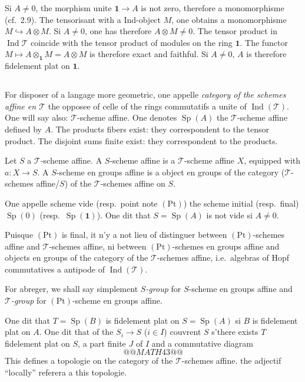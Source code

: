 \documentclass[12pt,a4paper]{article}
\theoremstyle{plain}
\theoremstyle{definition}
\DeclareMathOperator{\Sp}{Sp}
\DeclareMathOperator{\Ind}{Ind}
\begin{document}
Si $A \neq 0$, the morphism unite $\mathbf{1} \to A$ is not zero, therefore a monomorphisme (cf.~2.9). The tensorisant with a Ind-object $M$, one obtains a monomorphisme $M \hookrightarrow A \otimes M$. Si $A \neq 0$, one has therefore $A \otimes M \neq 0$. The tensor product in $\Ind\mathcal{T}$ coincide with the tensor product of modules on the ring $\mathbf{1}$. The functor $M \mapsto A \otimes_\mathbf{1} M = A \otimes M$ is therefore exact and faithful. Si $A \neq 0$, $A$ is therefore fidelement plat on $\mathbf{1}$.

\subsection{}

For disposer of a langage more geometric, one appelle \emph{category of the schemes affine en $\mathcal{T}$} the opposee of celle of the rings commutatifs a unite of $\Ind(\mathcal{T})$. One will say also: $\mathcal{T}$-scheme affine. One denotes $\Sp(A)$ the $\mathcal{T}$-scheme affine defined by $A$. The products fibers exist: they correspondent to the tensor product. The disjoint sums finite exist: they correspondent to the products.

Let $S$ a $\mathcal{T}$-scheme affine. A $S$-scheme affine is a $\mathcal{T}$-scheme affine $X$, equipped with $a : X \to S$. A $S$-scheme en groups affine is a object en groups of the category ($\mathcal{T}$-schemes affine/$S$) of the $\mathcal{T}$-schemes affine on $S$.

One appelle scheme vide (resp.~point note $(\mathrm{Pt})$) the scheme initial (resp.~final) $\Sp(0)$ (resp.~$\Sp(\mathbf{1})$). One dit that $S = \Sp(A)$ is not vide si $A \neq 0$.

Puisque $(\mathrm{Pt})$ is final, it n'y a not lieu of distinguer between $(\mathrm{Pt})$-schemes affine and $\mathcal{T}$-schemes affine, ni between $(\mathrm{Pt})$-schemes en groups affine and objects en groups of the category of the $\mathcal{T}$-schemes affine, i.e.~algebras of Hopf commutatives a antipode of $\Ind(\mathcal{T})$.

For abreger, we shall say simplement $S$\emph{-group} for $S$-scheme en groups affine and $\mathcal{T}$\emph{-group} for $(\mathrm{Pt})$-scheme en groups affine.

One dit that $T = \Sp(B)$ is fidelement plat on $S = \Sp(A)$ si $B$ is fidelement plat on $A$. One dit that of the $S_i \to S$ ($i \in I$) couvrent $S$ s'there exists $T$ fidelement plat on $S$, a part finite $J$ of $I$ and a commutative diagram
\[
@@MATH43@@
\]
This defines a topologie on the category of the $\mathcal{T}$-schemes affine. the adjectif ``locally'' referera a this topologie.
\end{document}
